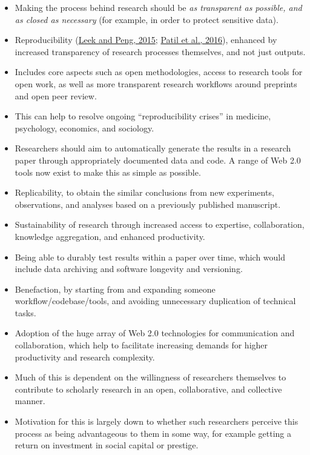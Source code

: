\begin{itemize}
\item
  Making the process behind research should be \emph{as transparent as
  possible, and as closed as necessary} (for example, in order to
  protect sensitive data).
\item
  Reproducibility (\href{https://doi.org/10.1073/pnas.1421412111}{Leek
  and Peng, 2015}; \href{https://doi.org/10.1101/066803}{Patil et al.,
  2016}), enhanced by increased transparency of research processes
  themselves, and not just outputs.
\item
  Includes core aspects such as open methodologies, access to research
  tools for open work, as well as more transparent research workflows
  around preprints and open peer review.
\item
  This can help to resolve ongoing ``reproducibility crises'' in
  medicine, psychology, economics, and sociology.
\item
  Researchers should aim to automatically generate the results in a
  research paper through appropriately documented data and code. A range
  of Web 2.0 tools now exist to make this as simple as possible.
\item
  Replicability, to obtain the similar conclusions from new experiments,
  observations, and analyses based on a previously published manuscript.
\item
  Sustainability of research through increased access to expertise,
  collaboration, knowledge aggregation, and enhanced productivity.
\item
  Being able to durably test results within a paper over time, which
  would include data archiving and software longevity and versioning.
\item
  Benefaction, by starting from and expanding someone
  workflow/codebase/tools, and avoiding unnecessary duplication of
  technical tasks.
\item
  Adoption of the huge array of Web 2.0 technologies for communication
  and collaboration, which help to facilitate increasing demands for
  higher productivity and research complexity.
\item
  Much of this is dependent on the willingness of researchers themselves
  to contribute to scholarly research in an open, collaborative, and
  collective manner.
\item
  Motivation for this is largely down to whether such researchers
  perceive this process as being advantageous to them in some way, for
  example getting a return on investment in social capital or prestige.

\end{itemize}
